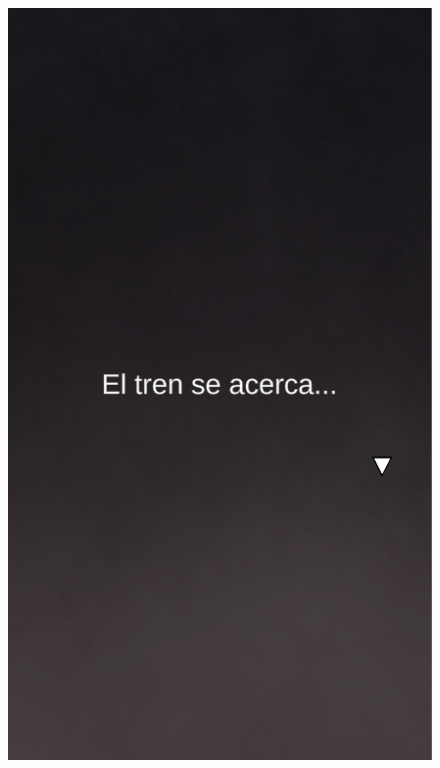 \begin{figure}[ht]
\begin{minipage}{.5\textwidth}
\begin{minipage}{.45\textwidth}
            \includegraphics[width=\textwidth]{imgs/screenshot01.png}
        \end{minipage}
        \begin{minipage}{.45\textwidth}

\end{minipage}
\end{minipage}
\end{figure}

